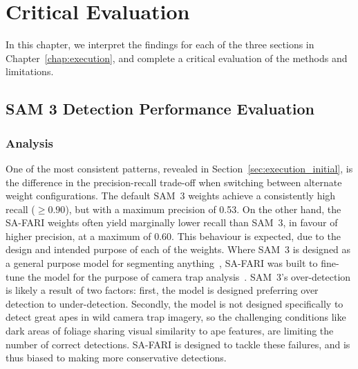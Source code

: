 \documentclass[author={Jacob Stephenson},
    degree={BSc},
    title={Robust Great Ape Species Detection in Wild Camera Trap Imagery with Promptable Concept Segmentation},
    unit={COMS30045},
    subtitle={}]{dissertation}
\begin{document}











\chapter{Critical Evaluation}
\label{chap:evaluation}

In this chapter, we interpret the findings for each of the three sections in Chapter~\ref{chap:execution}, and complete a critical evaluation of the methods and limitations.

\section{SAM 3 Detection Performance Evaluation}

\subsection{Analysis}

One of the most consistent patterns, revealed in Section~\ref{sec:execution_initial}, is the difference in the precision-recall trade-off when switching between alternate weight configurations. The default SAM~3 weights achieve a consistently high recall ($\ge0.90$), but with a maximum precision of 0.53. On the other hand, the SA-FARI weights often yield marginally lower recall than SAM~3, in favour of higher precision, at a maximum of 0.60. This behaviour is expected, due to the design and intended purpose of each of the weights. Where SAM~3 is designed as a general purpose model for segmenting anything~\cite{carion2025sam3segmentconcepts}, SA-FARI was built to fine-tune the model for the purpose of camera trap analysis~\cite{wasmuht2025safaridatasetsegmentfootage}. SAM~3's over-detection is likely a result of two factors: first, the model is designed preferring over detection to under-detection. Secondly, the model is not designed specifically to detect great apes in wild camera trap imagery, so the challenging conditions like dark areas of foliage sharing visual similarity to ape features, are limiting the number of correct detections. SA-FARI is designed to tackle these failures, and is thus biased to making more conservative detections.
\end{document}
